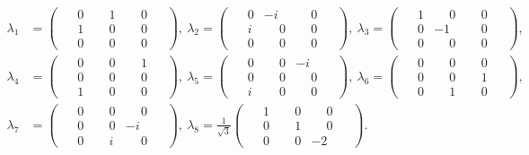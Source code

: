 \begin{equation}
	\begin{aligned}
\lambda_1 &= \begin{pmatrix} \phantom{-}0 & \phantom{-}1 & \phantom{-}0\phantom{-} \\ \phantom{-}1 & \phantom{-}0 & \phantom{-}0\phantom{-} \\ \phantom{-}0 & \phantom{-}0 & \phantom{-}0\phantom{-} \end{pmatrix},\
\lambda_2 = \begin{pmatrix} \phantom{-}0 & -i & \phantom{-}0\phantom{-} \\ \phantom{-}i & \phantom{-}0 & \phantom{-}0\phantom{-} \\ \phantom{-}0 & \phantom{-}0 & \phantom{-}0\phantom{-} \end{pmatrix} ,\
\lambda_3 = \begin{pmatrix} \phantom{-}1 & \phantom{-}0 & \phantom{-}0\phantom{-} \\ \phantom{-}0 & -1 & \phantom{-}0\phantom{-} \\ \phantom{-}0 & \phantom{-}0 & \phantom{-}0\phantom{-} \end{pmatrix}, \\[0.5em]
\lambda_4 &= \begin{pmatrix} \phantom{-}0 & \phantom{-}0 & \phantom{-}1\phantom{-} \\ \phantom{-}0 & \phantom{-}0 & \phantom{-}0\phantom{-} \\ \phantom{-}1 & \phantom{-}0 & \phantom{-}0\phantom{-} \end{pmatrix},\ 
\lambda_5 = \begin{pmatrix} \phantom{-}0 & \phantom{-}0 & -i\phantom{-} \\ \phantom{-}0 & \phantom{-}0 & \phantom{-}0\phantom{-} \\ \phantom{-}i & \phantom{-}0 & \phantom{-}0\phantom{-} \end{pmatrix},\
\lambda_6 = \begin{pmatrix} \phantom{-}0 & \phantom{-}0 & \phantom{-}0\phantom{-} \\ \phantom{-}0 & \phantom{-}0 & \phantom{-}1\phantom{-} \\ \phantom{-}0 & \phantom{-}1 & \phantom{-}0\phantom{-} \end{pmatrix}, \\[0.5em]
\lambda_7 &= \begin{pmatrix} \phantom{-}0 & \phantom{-}0 & \phantom{-}0\phantom{-} \\ \phantom{-}0 & \phantom{-}0 & -i\phantom{-} \\ \phantom{-}0 & \phantom{-}i & \phantom{-}0\phantom{-} \end{pmatrix},\
\lambda_8 = \frac{1}{\sqrt{3}} \begin{pmatrix} \phantom{-}1 & \phantom{-}0 & \phantom{-}0\phantom{-} \\ \phantom{-}0 & \phantom{-}1 & \phantom{-}0\phantom{-} \\ \phantom{-}0 & \phantom{-}0 & -2\phantom{-} \end{pmatrix}.
	\end{aligned}\label{eqn:Gell-Mann}
\end{equation}
